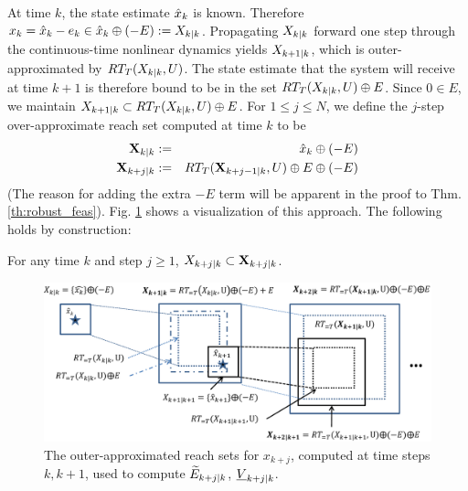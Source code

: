  At time $k$, the state estimate $\hat{x}_{k}$ is known.
 Therefore $x_k = \hat{x}_{k} - e_k \in \hat{x}_{k} \oplus (-E) := X_{k|k}$.
 Propagating $X_{k|k}$ forward one step through the continuous-time nonlinear dynamics yields $X_{k+1|k}$, which is outer-approximated by $RT_T(X_{k|k},U)$.
 The state estimate that the system will receive at time $k+1$ is therefore bound to be in the set $RT_T(X_{k|k},U)  \oplus E$.
 Since $0 \in E$, we maintain $X_{k+1|k} \subset RT_T(X_{k|k},U)  \oplus E$.
For $1 \leq j \leq N$, we define the $j$-step over-approximate reach set computed at time $k$ to be
 \begin{eqnarray}
 \label{eq:def Xkj}
 \mathbf{X}_{k|k} &:=&   \hat{x}_{k} \oplus (-E) 
 \nonumber
 \\
 \mathbf{X}_{k+j|k} & :=& RT_T(\mathbf{X}_{k+j-1|k},U) \oplus E \oplus (-E) 
 \end{eqnarray}
  (The reason for adding the extra $-E$ term will be apparent in the proof to Thm. \ref{th:robust_feas}).
  Fig. \ref{fig:overreach_NL} shows a visualization of this approach.
 The following holds by construction:
 \begin{lemma}
 	\label{lemma:xreach}
 	For any time $k$ and step $j \geq 1$,
 	$X_{k+j|k} \subset \mathbf{X}_{k+j|k}$.
 \end{lemma}
 
 
 \begin{figure}
 	\includegraphics[scale=0.4]{figs/OverReachFigure_NL_scissored.pdf}
 	\caption{The outer-approximated reach sets for $x_{k+j}$, computed at time steps $k,k+1$, used to compute $\widetilde{E}_{k+j|k}$, $\underline{V}_{k+j|k}$. }
 	\label{fig:overreach_NL}
 \end{figure}
 
